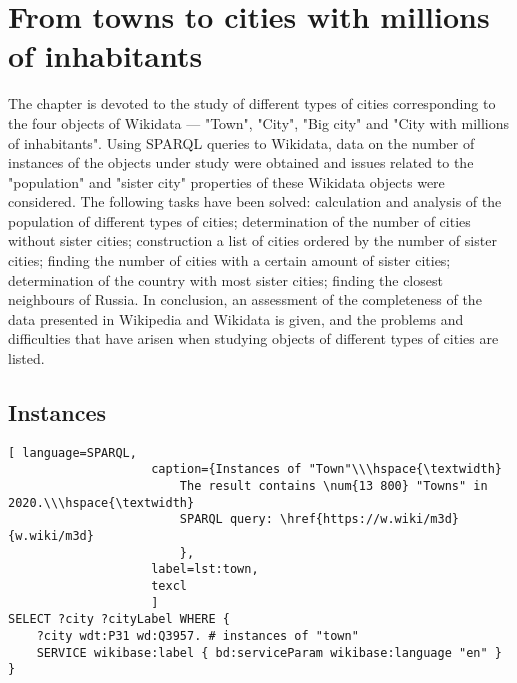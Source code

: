 \setchapterpreamble[u]{\margintoc}
\chapter{From towns to cities with millions of inhabitants\protect\footnotemark}


The chapter is devoted to the study of different types of cities corresponding to the four objects of Wikidata — "Town", "City", "Big city" and "City with millions of inhabitants". Using SPARQL queries to Wikidata, data on the number of instances of the objects under study were obtained and issues related to the "population" and "sister city" properties of these Wikidata objects were considered. The following tasks have been solved: calculation and analysis of the population of different types of cities; determination of the number of cities without sister cities; construction a list of cities ordered by the number of sister cities; finding the number of cities with a certain amount of sister cities; determination of the country with most sister cities; finding the closest neighbours of Russia. In conclusion, an assessment of the completeness of the data presented in Wikipedia and Wikidata is given, and the problems and difficulties that have arisen when studying objects of different types of cities are listed.

\section{Instances}
\begin{lstlisting}[ language=SPARQL, 
                    caption={Instances of "Town"\\\hspace{\textwidth}
                        The result contains \num{13 800} "Towns" in 2020.\\\hspace{\textwidth}
                        SPARQL query: \href{https://w.wiki/m3d}{w.wiki/m3d}
                        },
                    label=lst:town,
                    texcl 
                    ]
SELECT ?city ?cityLabel WHERE {
	?city wdt:P31 wd:Q3957. # instances of "town"
	SERVICE wikibase:label { bd:serviceParam wikibase:language "en" }
}
\end{lstlisting}%

